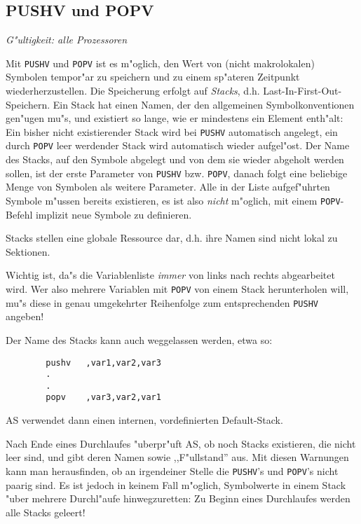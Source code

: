\documentclass[12pt,a4paper,twoside]{report}
\makeatletter
\newcommand{\tty}[1]{{\tt #1}}
\newcommand{\ttindex}[1]{\index{#1@{\tt #1}}}
\makeatother
\begin{document}

\subsection{PUSHV und POPV}
\ttindex{PUSHV}\ttindex{POPV}

{\em G"ultigkeit: alle Prozessoren}

Mit \tty{PUSHV} und \tty{POPV} ist es m"oglich, den Wert von (nicht
makrolokalen) Symbolen tempor"ar zu speichern und zu einem sp"ateren
Zeitpunkt wiederherzustellen.  Die Speicherung erfolgt auf {\em Stacks},
d.h. Last-In-First-Out-Speichern.  Ein Stack hat einen Namen, der den
allgemeinen Symbolkonventionen gen"ugen mu"s, und existiert so lange,
wie er mindestens ein Element enth"alt: Ein bisher nicht existierender
Stack wird bei \tty{PUSHV} automatisch angelegt, ein durch \tty{POPV} leer
werdender Stack wird automatisch wieder aufgel"ost.  Der Name des Stacks,
auf den Symbole abgelegt und von dem sie wieder abgeholt werden sollen,
ist der erste Parameter von \tty{PUSHV} bzw. \tty{POPV}, danach folgt
eine beliebige Menge von Symbolen als weitere Parameter.  Alle in der
Liste aufgef"uhrten Symbole m"ussen bereits existieren, es ist also
{\em nicht} m"oglich, mit einem \tty{POPV}-Befehl implizit neue Symbole
zu definieren.
\par
Stacks stellen eine globale Ressource dar, d.h. ihre Namen sind
nicht lokal zu Sektionen.
\par
Wichtig ist, da"s die Variablenliste {\em immer} von links nach rechts
abgearbeitet wird.  Wer also mehrere Variablen mit \tty{POPV} von einem
Stack herunterholen will, mu"s diese in genau umgekehrter Reihenfolge
zum entsprechenden \tty{PUSHV} angeben!
\par
Der Name des Stacks kann auch weggelassen werden, etwa so:
\begin{verbatim}
        pushv   ,var1,var2,var3
        .
        .
        popv    ,var3,var2,var1
\end{verbatim}
AS verwendet dann einen internen, vordefinierten Default-Stack.
\par
Nach Ende eines Durchlaufes "uberpr"uft AS, ob noch Stacks existieren,
die nicht leer sind, und gibt deren Namen sowie ,,F"ullstand'' aus.  Mit
diesen Warnungen kann man herausfinden, ob an irgendeiner Stelle die
\tty{PUSHV}'s und \tty{POPV}'s nicht paarig sind.  Es ist jedoch in
keinem Fall m"oglich, Symbolwerte in einem Stack "uber mehrere Durchl"aufe
hinwegzuretten: Zu Beginn eines Durchlaufes werden alle Stacks geleert!
\end{document}
